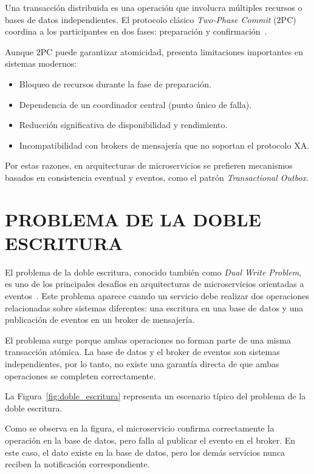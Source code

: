 Una transacción distribuida es una operación que involucra múltiples recursos o bases de datos independientes. El protocolo clásico \textit{Two-Phase Commit} (2PC) coordina a los participantes en dos fases: preparación y confirmación~\parencite{tanenbaum2017}.

Aunque 2PC puede garantizar atomicidad, presenta limitaciones importantes en sistemas modernos:

\begin{itemize}
    \item Bloqueo de recursos durante la fase de preparación.
    \item Dependencia de un coordinador central (punto único de falla).
    \item Reducción significativa de disponibilidad y rendimiento.
    \item Incompatibilidad con brokers de mensajería que no soportan el protocolo XA.
\end{itemize}

Por estas razones, en arquitecturas de microservicios se prefieren mecanismos basados en consistencia eventual y eventos, como el patrón \textit{Transactional Outbox}.

\section{PROBLEMA DE LA DOBLE ESCRITURA}

El problema de la doble escritura, conocido también como \textit{Dual Write Problem}, es uno de los principales desafíos en arquitecturas de microservicios orientadas a eventos~\parencite{richardson2018}. Este problema aparece cuando un servicio debe realizar dos operaciones relacionadas sobre sistemas diferentes: una escritura en una base de datos y una publicación de eventos en un broker de mensajería.

El problema surge porque ambas operaciones no forman parte de una misma transacción atómica. La base de datos y el broker de eventos son sistemas independientes, por lo tanto, no existe una garantía directa de que ambas operaciones se completen correctamente.

La Figura~\ref{fig:doble_escritura} representa un escenario típico del problema de la doble escritura.



Como se observa en la figura, el microservicio confirma correctamente la operación en la base de datos, pero falla al publicar el evento en el broker. En este caso, el dato existe en la base de datos, pero los demás servicios nunca reciben la notificación correspondiente.

